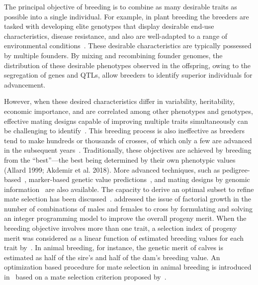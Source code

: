 \documentclass[12pt, a4paper, bibliography=totoc]{scrartcl}
\begin{document}
The principal objective of breeding is to combine as many desirable traits as possible into a single individual. For example, in plant breeding the breeders are tasked with developing elite genotypes that display desirable end-use characteristics, disease resistance, and also are well-adapted to a range of environmental conditions~\citep{Breseghello2013}. These desirable characteristics are typically possessed by multiple founders. By mixing and recombining founder genomes, the distribution of these desirable phenotypes observed in the offspring, owing to the segregation of genes and QTLs, allow breeders to identify superior individuals for advancement. 

However, when these desired characteristics differ in variability, heritability, economic importance, and are correlated among other phenotypes and genotypes, effective mating designs capable of improving multiple traits simultaneously can be challenging to identify~\citep{johnson1988model}. This breeding process is also ineffective as breeders tend to make hundreds or thousands of crosses, of which only a few are advanced in the subsequent years~\citep{witcombe2013plant}. Traditionally, these objectives are achieved by breeding from the ``best''---the best being determined by their own phenotypic values (Allard 1999; Akdemir et al. 2018). More advanced techniques, such as pedigree-based~\citep{henderson1984applications, gianola1986bayesian}, marker-based genetic value predictions~\citep{lande1990efficiency, hospital1997marker, bernardo2006usefulness}, and mating designs by genomic information~\citep{akdemir2016efficient} are also  available. The capacity to derive an optimal subset to refine mate selection has been discussed~\citep{akdemir2016efficient, han2017predicted}. \cite{jansen1985selecting} addressed the issue of factorial growth in the number of combinations of males and females to cross by formulating and solving an integer programming model to improve the overall progeny merit. When the breeding objective involves more than one trait, a selection index of progeny merit was considered as a linear function of estimated breeding values for each trait by~\cite{allaire1980mate}. In animal breeding, for instance, the genetic merit of calves is estimated as half of the sire's and half of the dam's breeding value. An optimization based procedure for mate selection in animal breeding is introduced in~\citep{kinghorn1998mate, kinghorn2011algorithm} based on a mate selection criterion  proposed by~\cite{kinghorn199919}.  
\end{document}
